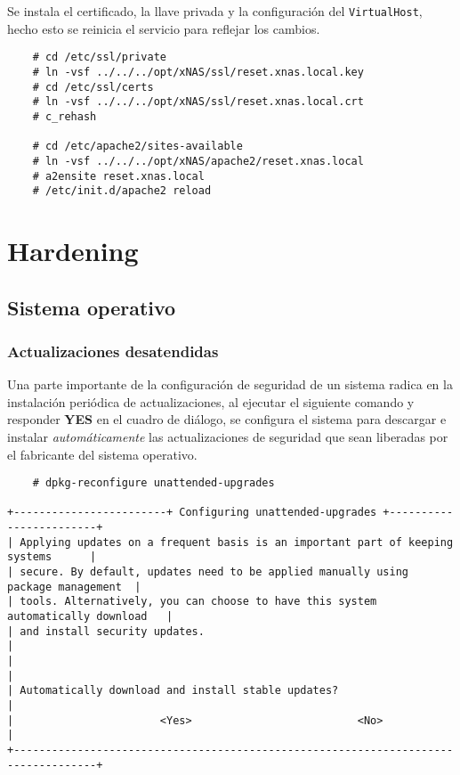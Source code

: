 Se instala el certificado, la llave privada y la configuraci\'{o}n del \texttt{VirtualHost}, hecho esto se reinicia el servicio para reflejar los cambios.

{
\scriptsize
\linespread{1}
\begin{verbatim}
    # cd /etc/ssl/private
    # ln -vsf ../../../opt/xNAS/ssl/reset.xnas.local.key
    # cd /etc/ssl/certs
    # ln -vsf ../../../opt/xNAS/ssl/reset.xnas.local.crt
    # c_rehash

    # cd /etc/apache2/sites-available
    # ln -vsf ../../../opt/xNAS/apache2/reset.xnas.local
    # a2ensite reset.xnas.local
    # /etc/init.d/apache2 reload
\end{verbatim}
}

    \section {Hardening}

      \subsection {Sistema operativo}

        \subsubsection {Actualizaciones desatendidas}

Una parte importante de la configuraci\'{o}n de seguridad de un sistema radica en la instalaci\'{o}n peri\'{o}dica de actualizaciones, al ejecutar el siguiente comando y responder \textbf{YES} en el cuadro de di\'{a}logo, se configura el sistema para descargar e instalar \emph{autom\'{a}ticamente} las actualizaciones de seguridad que sean liberadas por el fabricante del sistema operativo.

{
\scriptsize
\linespread{1}
\begin{verbatim}
    # dpkg-reconfigure unattended-upgrades

+------------------------+ Configuring unattended-upgrades +------------------------+
| Applying updates on a frequent basis is an important part of keeping systems      |
| secure. By default, updates need to be applied manually using package management  |
| tools. Alternatively, you can choose to have this system automatically download   |
| and install security updates.                                                     |
|                                                                                   |
| Automatically download and install stable updates?                                |
|                       <Yes>                          <No>                         |
+-----------------------------------------------------------------------------------+
\end{verbatim}
}

